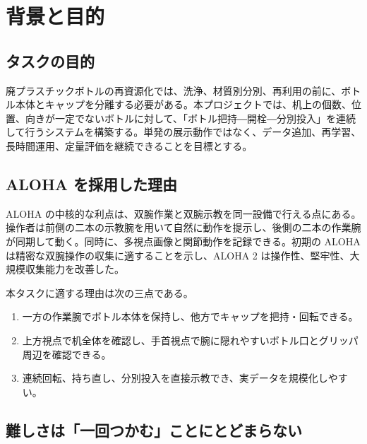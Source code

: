 \chapter{背景と目的}

\section{タスクの目的}

廃プラスチックボトルの再資源化では、洗浄、材質別分別、再利用の前に、ボトル本体とキャップを分離する必要がある。本プロジェクトでは、机上の個数、位置、向きが一定でないボトルに対して、「ボトル把持―開栓―分別投入」を連続して行うシステムを構築する。単発の展示動作ではなく、データ追加、再学習、長時間運用、定量評価を継続できることを目標とする。


\section{ALOHA を採用した理由}

ALOHA の中核的な利点は、双腕作業と双腕示教を同一設備で行える点にある。操作者は前側の二本の示教腕を用いて自然に動作を提示し、後側の二本の作業腕が同期して動く。同時に、多視点画像と関節動作を記録できる。初期の ALOHA は精密な双腕操作の収集に適することを示し、ALOHA 2 は操作性、堅牢性、大規模収集能力を改善した\cite{zhao2023aloha,aloha2_2024}。

本タスクに適する理由は次の三点である。

\begin{enumerate}
  \item 一方の作業腕でボトル本体を保持し、他方でキャップを把持・回転できる。
  \item 上方視点で机全体を確認し、手首視点で腕に隠れやすいボトル口とグリッパ周辺を確認できる。
  \item 連続回転、持ち直し、分別投入を直接示教でき、実データを規模化しやすい。
\end{enumerate}


\section{難しさは「一回つかむ」ことにとどまらない}


